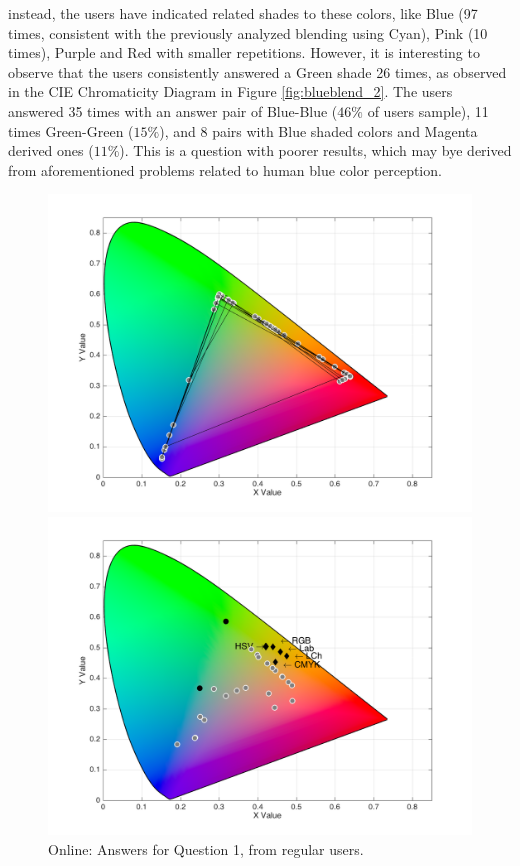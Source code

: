 instead, the users have indicated related shades to these colors,
like Blue (97 times, consistent with the previously analyzed blending using Cyan), Pink (10 times), Purple and Red with smaller repetitions.
However, it is interesting to observe that the users consistently answered a Green shade 26 times, as observed in the CIE Chromaticity Diagram
in Figure \ref{fig:blueblend_2}. The users answered 35 times with an answer pair of Blue-Blue ($46\%$ of users sample), 11 times Green-Green ($15\%$),
and 8 pairs with Blue shaded colors and Magenta derived ones ($11\%$). This is a question with poorer results, which may bye derived from aforementioned
problems related to human blue color perception.
%
\begin{figure}[!htbp]
  \centering
  \begin{minipage}{0.48\textwidth}
    \centering
    \includegraphics[width=\textwidth]{images/results/1_online_regularUsers.png}
    \caption[Online: Answers for Question 1, from regular users.]{Online: Answers for Question 1, from regular users.}
    \label{fig:yellowblend_1}
  \end{minipage}\hfill
  \begin{minipage}{0.48\textwidth}
    \centering
    \includegraphics[width=\textwidth]{images/results/18_online_regularUsers.png}

\end{minipage}
\end{figure}
